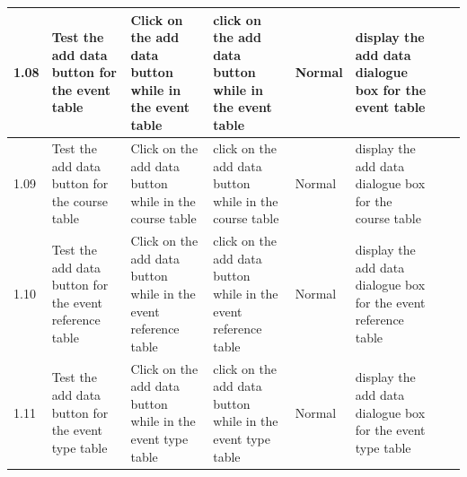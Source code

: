 \begin{landscape}
\begin{center}
\begin{longtable}{|p{1.5cm}|p{2.5cm}|p{2.5cm}|p{2cm}|p{2cm}|p{2cm}|p{2cm}|p{2cm}|}
        \rowcolor{DarkGray}1.08 & Test the add data button for the event  table & Click on the add data button while in the event table & click on the add data button while in the event table & Normal & display the add data dialogue box for the event  table & & \\ \hline
        \rowcolor{DarkGray}1.09 & Test the add data button for the course  table & Click on the add data button while in the course table & click on the add data button while in the course table & Normal & display the add data dialogue box for the course  table & & \\ \hline
        \rowcolor{DarkGray}1.10 & Test the add data button for the event reference  table & Click on the add data button while in the event reference table & click on the add data button while in the event reference table & Normal & display the add data dialogue box for the event reference  table & & \\ \hline
        \rowcolor{DarkGray}1.11 & Test the add data button for the event type  table & Click on the add data button while in the event type table & click on the add data button while in the event type table & Normal & display the add data dialogue box for the event type  table & & \\ \hline
        

\end{longtable}
\end{center}
\end{landscape}

